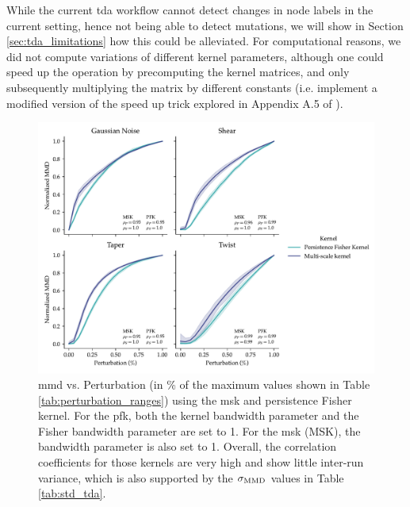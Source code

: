 While the current \gls{tda} workflow cannot detect changes in node labels in the current setting, hence
not being able to detect mutations, we will show in Section
\ref{sec:tda_limitations} how this could be alleviated. For computational
reasons, we did not compute variations of different kernel parameters, although
one could speed up the operation by precomputing the kernel matrices, and only
subsequently multiplying the matrix by different constants (i.e. implement a
modified version of the speed up trick explored in Appendix A.5 of
\cite{obray2022evaluation}).

\begin{figure}
  \centering
  \includegraphics[width=\textwidth]{./figures/results/res_6.pdf}
  \caption[\gls{mmd} using topological kernels.]{\gls{mmd} vs. Perturbation (in
\% of the maximum values shown in Table \ref{tab:perturbation_ranges}) using the
\gls{msk} and persistence Fisher kernel. For the \gls{pfk}, both the
kernel bandwidth parameter and the Fisher bandwidth parameter are set to 1. For
the \gls{msk} (MSK), the bandwidth parameter is also set to 1. Overall,
the correlation coefficients for those kernels are very high and show little
inter-run variance, which is also supported by the $\sigma_{\text{MMD}}$ values in Table
\ref{tab:std_tda}.}
  \label{fig:tda_kernels}
\end{figure}

